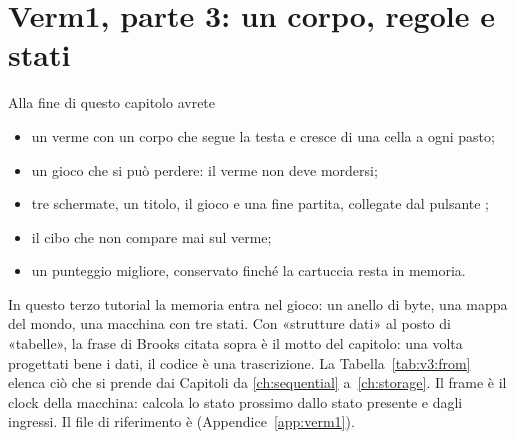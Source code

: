 \chapter{Verm1, parte 3: un corpo, regole e stati}
\label{ch:verm1p3}


\begin{chapgoals}
Alla fine di questo capitolo avrete
\begin{itemize}
\item un verme con un corpo che segue la testa e cresce di una cella a ogni pasto;
\item un gioco che si può perdere: il verme non deve mordersi;
\item tre schermate, un titolo, il gioco e una fine partita, collegate dal pulsante ;
\item il cibo che non compare mai sul verme;
\item un punteggio migliore, conservato finché la cartuccia resta in memoria.
\end{itemize}
\end{chapgoals}


In questo terzo tutorial la memoria entra nel gioco: un anello di byte, una
mappa del mondo, una macchina con tre stati. Con «strutture dati» al posto di
«tabelle», la frase di Brooks citata sopra è il motto del capitolo: una volta
progettati bene i dati, il codice è una trascrizione. La
Tabella~\ref{tab:v3:from} elenca ciò che si prende dai Capitoli da
\ref{ch:sequential} a~\ref{ch:storage}. Il frame è il clock della macchina:
 calcola lo stato prossimo dallo stato presente e dagli ingressi.
Il file di riferimento è  (Appendice~\ref{app:verm1}).


